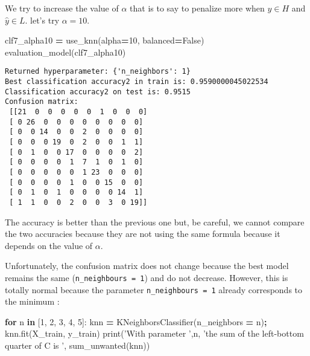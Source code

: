 \documentclass[10pt,a4paper]{article}
\newenvironment{Shaded}{\begin{snugshade}}{\end{snugshade}}
\newcommand{\BuiltInTok}[1]{#1}
\newcommand{\ControlFlowTok}[1]{\textcolor[rgb]{0.13,0.29,0.53}{\textbf{#1}}}
\newcommand{\DecValTok}[1]{\textcolor[rgb]{0.00,0.00,0.81}{#1}}
\newcommand{\KeywordTok}[1]{\textcolor[rgb]{0.13,0.29,0.53}{\textbf{#1}}}
\newcommand{\NormalTok}[1]{#1}
\newcommand{\OperatorTok}[1]{\textcolor[rgb]{0.81,0.36,0.00}{\textbf{#1}}}
\newcommand{\StringTok}[1]{\textcolor[rgb]{0.31,0.60,0.02}{#1}}
\newcommand{\VariableTok}[1]{\textcolor[rgb]{0.00,0.00,0.00}{#1}}
\theoremstyle{break}
\begin{document}
We try to increase the value of \(\alpha\) that is to say to penalize more when \(y \in H\) and \(\hat{y} \in L\). let's try \(\alpha=10\).

\begin{Shaded}
\begin{Highlighting}[]
\NormalTok{clf7_alpha10 }\OperatorTok{=}\NormalTok{ use_knn(alpha}\OperatorTok{=}\DecValTok{10}\NormalTok{, balanced}\OperatorTok{=}\VariableTok{False}\NormalTok{)}
\NormalTok{evaluation_model(clf7_alpha10)}
\end{Highlighting}
\end{Shaded}

\begin{verbatim}
Returned hyperparameter: {'n_neighbors': 1}
Best classification accuracy2 in train is: 0.9590000045022534
Classification accuracy2 on test is: 0.9515
Confusion matrix: 
 [[21  0  0  0  0  0  1  0  0  0]
 [ 0 26  0  0  0  0  0  0  0  0]
 [ 0  0 14  0  0  2  0  0  0  0]
 [ 0  0  0 19  0  2  0  0  1  1]
 [ 0  1  0  0 17  0  0  0  0  2]
 [ 0  0  0  0  1  7  1  0  1  0]
 [ 0  0  0  0  0  1 23  0  0  0]
 [ 0  0  0  0  1  0  0 15  0  0]
 [ 0  1  0  1  0  0  0  0 14  1]
 [ 1  1  0  0  2  0  0  3  0 19]]
\end{verbatim}

The accuracy is better than the previous one but, be careful, we cannot compare the two accuracies because they are not using the same formula because it depends on the value of \(\alpha\).

Unfortunately, the confusion matrix does not change because the best model remains the same (\texttt{n\_neighbours\ =\ 1}) and do not decrease. However, this is totally normal because the parameter \texttt{n\_neighbours\ =\ 1} already corresponds to the minimum :

\begin{Shaded}
\begin{Highlighting}[]
\ControlFlowTok{for}\NormalTok{ n }\KeywordTok{in}\NormalTok{ [}\DecValTok{1}\NormalTok{, }\DecValTok{2}\NormalTok{, }\DecValTok{3}\NormalTok{, }\DecValTok{4}\NormalTok{, }\DecValTok{5}\NormalTok{]:}
\NormalTok{    knn }\OperatorTok{=}\NormalTok{ KNeighborsClassifier(n_neighbors }\OperatorTok{=}\NormalTok{ n)}\OperatorTok{;}
\NormalTok{    knn.fit(X_train, y_train)}
    \BuiltInTok{print}\NormalTok{(}\StringTok{'With parameter '}\NormalTok{,n, }\StringTok{'the sum of the left-bottom quarter of C is '}\NormalTok{, sum_unwanted(knn))}
\end{Highlighting}
\end{Shaded}
\end{document}
